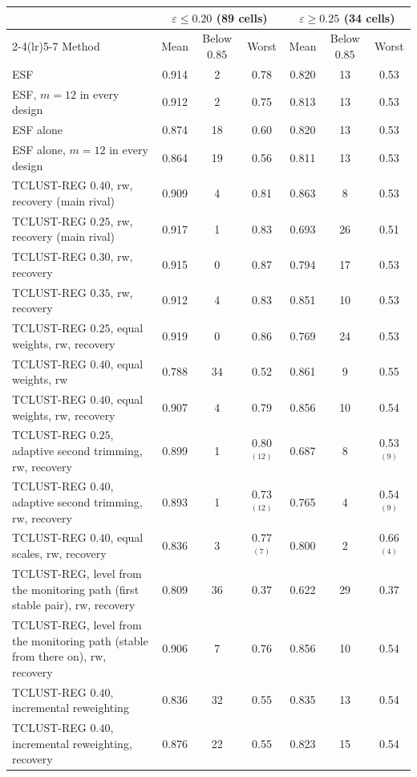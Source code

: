 \begin{tabular}{lcccccc}
\toprule
 & \multicolumn{3}{c}{$\varepsilon\le0.20$ (89 cells)} & \multicolumn{3}{c}{$\varepsilon\ge0.25$ (34 cells)} \\
\cmidrule(lr){2-4}\cmidrule(lr){5-7}
Method & Mean & Below $0.85$ & Worst & Mean & Below $0.85$ & Worst \\
\midrule
ESF & 0.914 & 2 & 0.78 & 0.820 & 13 & 0.53 \\
ESF, $m=12$ in every design & 0.912 & 2 & 0.75 & 0.813 & 13 & 0.53 \\
ESF alone & 0.874 & 18 & 0.60 & 0.820 & 13 & 0.53 \\
ESF alone, $m=12$ in every design & 0.864 & 19 & 0.56 & 0.811 & 13 & 0.53 \\
TCLUST-REG $0.40$, rw, recovery (main rival) & 0.909 & 4 & 0.81 & 0.863 & 8 & 0.53 \\
TCLUST-REG $0.25$, rw, recovery (main rival) & 0.917 & 1 & 0.83 & 0.693 & 26 & 0.51 \\
TCLUST-REG $0.30$, rw, recovery & 0.915 & 0 & 0.87 & 0.794 & 17 & 0.53 \\
TCLUST-REG $0.35$, rw, recovery & 0.912 & 4 & 0.83 & 0.851 & 10 & 0.53 \\
TCLUST-REG $0.25$, equal weights, rw, recovery & 0.919 & 0 & 0.86 & 0.769 & 24 & 0.53 \\
TCLUST-REG $0.40$, equal weights, rw & 0.788 & 34 & 0.52 & 0.861 & 9 & 0.55 \\
TCLUST-REG $0.40$, equal weights, rw, recovery & 0.907 & 4 & 0.79 & 0.856 & 10 & 0.54 \\
TCLUST-REG $0.25$, adaptive second trimming, rw, recovery & 0.899 & 1 & 0.80$^{(12)}$ & 0.687 & 8 & 0.53$^{(9)}$ \\
TCLUST-REG $0.40$, adaptive second trimming, rw, recovery & 0.893 & 1 & 0.73$^{(12)}$ & 0.765 & 4 & 0.54$^{(9)}$ \\
TCLUST-REG $0.40$, equal scales, rw, recovery & 0.836 & 3 & 0.77$^{(7)}$ & 0.800 & 2 & 0.66$^{(4)}$ \\
TCLUST-REG, level from the monitoring path (first stable pair), rw, recovery & 0.809 & 36 & 0.37 & 0.622 & 29 & 0.37 \\
TCLUST-REG, level from the monitoring path (stable from there on), rw, recovery & 0.906 & 7 & 0.76 & 0.856 & 10 & 0.54 \\
TCLUST-REG $0.40$, incremental reweighting & 0.836 & 32 & 0.55 & 0.835 & 13 & 0.54 \\
TCLUST-REG $0.40$, incremental reweighting, recovery & 0.876 & 22 & 0.55 & 0.823 & 15 & 0.54 \\

\end{tabular}
